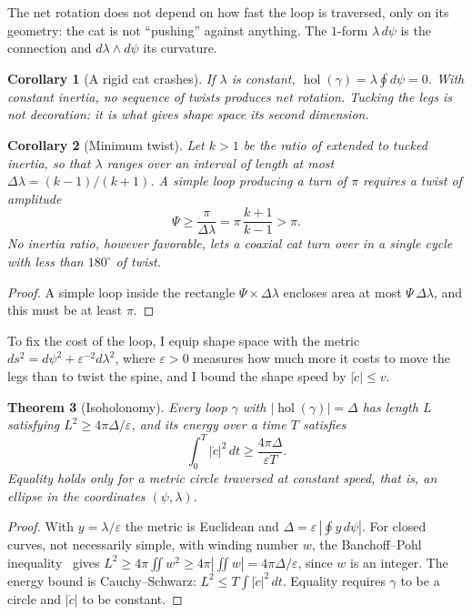 \documentclass[11pt,a4paper]{article}
\theoremstyle{plain}
\newtheorem{teorema}{Theorem}[section]
\newtheorem{corolario}[teorema]{Corollary}
\theoremstyle{definition}
\theoremstyle{remark}
\numberwithin{equation}{section}
\DeclareMathOperator{\hol}{hol}
\begin{document}
The net rotation does not depend on how fast the loop is traversed, only on its geometry: the cat is not ``pushing'' against anything. The $1$-form $\lambda\,d\psi$ is the connection and $d\lambda\wedge d\psi$ its curvature.

\begin{corolario}[A rigid cat crashes]\label{cor:rigido}
If $\lambda$ is constant, $\hol(\gamma)=\lambda\oint d\psi=0$. With constant inertia, no sequence of twists produces net rotation. Tucking the legs is not decoration: it is what gives shape space its second dimension.
\end{corolario}

\begin{corolario}[Minimum twist]\label{cor:torsion}
Let $k>1$ be the ratio of extended to tucked inertia, so that $\lambda$ ranges over an interval of length at most $\Delta\lambda=(k-1)/(k+1)$. A simple loop producing a turn of $\pi$ requires a twist of amplitude
\begin{equation}
  \Psi\ge\frac{\pi}{\Delta\lambda}=\pi\,\frac{k+1}{k-1}>\pi.
\end{equation}
No inertia ratio, however favorable, lets a coaxial cat turn over in a single cycle with less than $180^\circ$ of twist.
\end{corolario}

\begin{proof}
A simple loop inside the rectangle $\Psi\times\Delta\lambda$ encloses area at most $\Psi\,\Delta\lambda$, and this must be at least $\pi$.
\end{proof}

To fix the cost of the loop, I equip shape space with the metric $ds^2=d\psi^2+\varepsilon^{-2}d\lambda^2$, where $\varepsilon>0$ measures how much more it costs to move the legs than to twist the spine, and I bound the shape speed by $|\dot c|\le v$.

\begin{teorema}[Isoholonomy]\label{teo:isoholonomia}
Every loop $\gamma$ with $|\hol(\gamma)|=\Delta$ has length $L$ satisfying $L^2\ge 4\pi\Delta/\varepsilon$, and its energy over a time $T$ satisfies
\begin{equation}
  \int_0^T|\dot c|^2\,dt\ge\frac{4\pi\Delta}{\varepsilon T}.
\end{equation}
Equality holds only for a metric circle traversed at constant speed, that is, an ellipse in the coordinates $(\psi,\lambda)$.
\end{teorema}

\begin{proof}
With $y=\lambda/\varepsilon$ the metric is Euclidean and $\Delta=\varepsilon\,|\oint y\,d\psi|$. For closed curves, not necessarily simple, with winding number $w$, the Banchoff--Pohl inequality~\cite{banchoffpohl} gives $L^2\ge 4\pi\iint w^2\ge 4\pi\left|\iint w\right|=4\pi\Delta/\varepsilon$, since $w$ is an integer. The energy bound is Cauchy--Schwarz: $L^2\le T\int|\dot c|^2\,dt$. Equality requires $\gamma$ to be a circle and $|\dot c|$ to be constant.
\end{proof}
\end{document}
